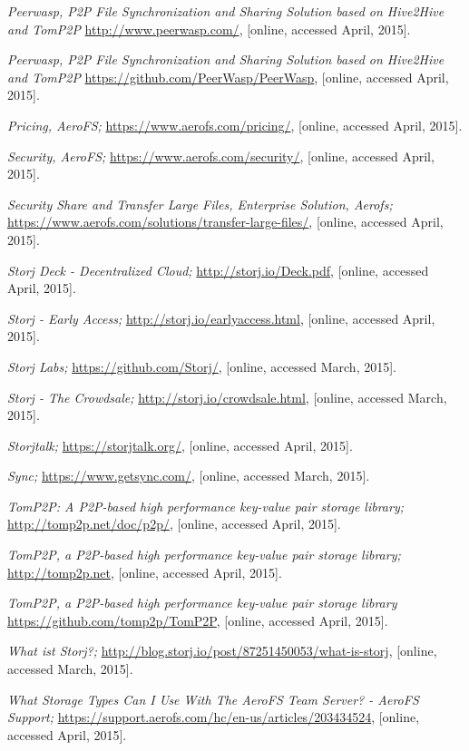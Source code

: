 \begin{thebibliography}{99}
		\emph{Peerwasp, P2P File Synchronization and Sharing Solution based on Hive2Hive and TomP2P}
		\url{http://www.peerwasp.com/},
		[online, accessed April, 2015].

		\emph{Peerwasp, P2P File Synchronization and Sharing Solution based on Hive2Hive and TomP2P}
		\url{https://github.com/PeerWasp/PeerWasp},
		[online, accessed April, 2015].

		\emph{Pricing, AeroFS;}
		\url{https://www.aerofs.com/pricing/},
		[online, accessed April, 2015].

		\emph{Security, AeroFS;}
		\url{https://www.aerofs.com/security/},
		[online, accessed April, 2015].
		
		\emph{Security Share and Transfer Large Files, Enterprise Solution, Aerofs;}
		\url{https://www.aerofs.com/solutions/transfer-large-files/},
		[online, accessed April, 2015].

		\emph{Storj Deck - Decentralized Cloud;}
		\url{http://storj.io/Deck.pdf},
		[online, accessed April, 2015].

		\emph{Storj - Early Access;}
		\url{http://storj.io/earlyaccess.html},
		[online, accessed April, 2015].
		
		\emph{Storj Labs;}
		\url{https://github.com/Storj/},
		[online, accessed March, 2015].
		
		\emph{Storj - The Crowdsale;}
		\url{http://storj.io/crowdsale.html},
		[online, accessed March, 2015].
		
		\emph{Storjtalk;}
		\url{https://storjtalk.org/},
		[online, accessed April, 2015].
		
		\emph{Sync;}
		\url{https://www.getsync.com/},
		[online, accessed March, 2015].
		
		\emph{TomP2P: A P2P-based high performance key-value pair storage library;}
		\url{http://tomp2p.net/doc/p2p/},
		[online, accessed April, 2015].		

		\emph{TomP2P, a P2P-based high performance key-value pair storage library;}
		\url{http://tomp2p.net},
		[online, accessed April, 2015].

		\emph{TomP2P, a P2P-based high performance key-value pair storage library}
		\url{https://github.com/tomp2p/TomP2P},
		[online, accessed April, 2015].

		\emph{What ist Storj?;}
		\url{http://blog.storj.io/post/87251450053/what-is-storj},
		[online, accessed March, 2015].

		\emph{What Storage Types Can I Use With The AeroFS Team Server? - AeroFS Support;}
		\url{https://support.aerofs.com/hc/en-us/articles/203434524},
		[online, accessed April, 2015].

\end{thebibliography}